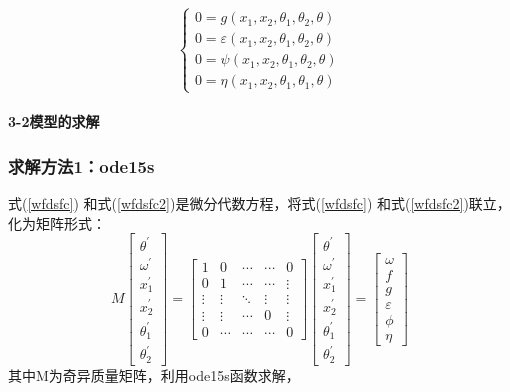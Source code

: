 \documentclass[withoutpreface,bwprint]{cumcmthesis} %
\begin{document}
	\begin{equation}\label{wfdsfc2}
	\left\{\begin{array}{l}
	0=g\left(x_{1}, x_{2}, \theta_{1}, \theta_{2}, \theta\right) \\
	0=\varepsilon\left(x_{1}, x_{2}, \theta_{1}, \theta_{2}, \theta\right) \\
	0=\psi\left(x_{1}, x_{2}, \theta_{1}, \theta_{2}, \theta\right) \\
	0=\eta\left(x_{1}, x_{2}, \theta_{1}, \theta_{1}, \theta\right)
	\end{array}\right.
	\end{equation}
	
		\paragraph{3-2模型的求解}
		\subsubsection{求解方法1：ode15s}
	式(\ref{wfdsfc}) 和式(\ref{wfdsfc2})是微分代数方程，将式(\ref{wfdsfc}) 和式(\ref{wfdsfc2})联立，化为矩阵形式：
	\begin{equation}\label{jzxs}
	M\left[\begin{array}{c}
	\theta^{\prime} \\
	\omega^{\prime} \\
	x_{1}^{\prime} \\
	x_{2}^{\prime} \\
	\theta_{1}^{\prime} \\
	\theta_{2}^{\prime}
	\end{array}\right]=\left[\begin{array}{ccccc}
	1 & 0 & \cdots & \cdots & 0 \\
	0 & 1 & \cdots & \cdots & \vdots \\
	\vdots & \vdots & \ddots & \vdots & \vdots \\
	\vdots & \vdots & \cdots & 0 & \vdots \\
	0 & \cdots & \cdots & \cdots & 0
	\end{array}\right]\left[\begin{array}{c}
	\theta^{\prime} \\
	\omega^{\prime} \\
	x_{1}^{\prime} \\
	x_{2}^{\prime} \\
	\theta_{1}^{\prime} \\
	\theta_{2}^{\prime}
	\end{array}\right]=\left[\begin{array}{c}
	\omega \\
	f \\
	g \\
	\varepsilon \\
	\phi \\
	\eta
	\end{array}\right]
	\end{equation}
	其中M为奇异质量矩阵，利用ode15s函数求解，
\end{document}
